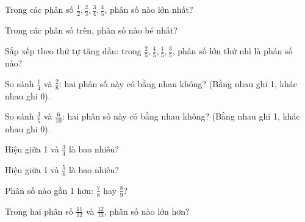 \begin{ex}
Trong các phân số $\frac{1}{2}, \frac{2}{3}, \frac{3}{4}, \frac{4}{5}$, phân số nào lớn nhất?
\end{ex}

\begin{ex}
Trong các phân số trên, phân số nào bé nhất?
\end{ex}

\begin{ex}
Sắp xếp theo thứ tự tăng dần: trong $\frac{2}{5}, \frac{4}{5}, \frac{1}{5}, \frac{3}{5}$, phân số lớn thứ nhì là phân số nào?
\end{ex}

\begin{ex}
So sánh $\frac{1}{4}$ và $\frac{2}{8}$: hai phân số này có bằng nhau không? (Bằng nhau ghi 1, khác nhau ghi 0).
\end{ex}

\begin{ex}
So sánh $\frac{3}{5}$ và $\frac{6}{10}$: hai phân số này có bằng nhau không? (Bằng nhau ghi 1, khác nhau ghi 0).
\end{ex}

\begin{ex}
Hiệu giữa 1 và $\frac{3}{4}$ là bao nhiêu?
\end{ex}

\begin{ex}
Hiệu giữa 1 và $\frac{5}{6}$ là bao nhiêu?
\end{ex}

\begin{ex}
Phân số nào gần 1 hơn: $\frac{7}{8}$ hay $\frac{8}{9}$?
\end{ex}

\begin{ex}
Trong hai phân số $\frac{11}{12}$ và $\frac{12}{13}$, phân số nào lớn hơn?
\end{ex}

